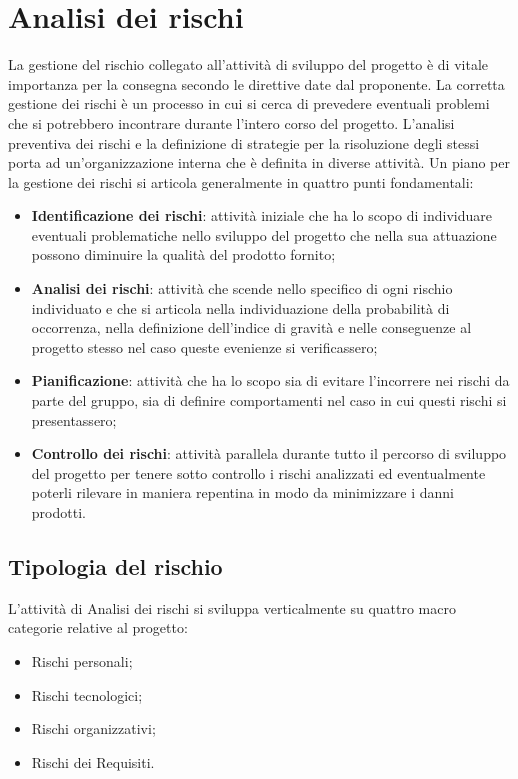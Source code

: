 \section{Analisi dei rischi} \label{_analisiDeiRischi}
	La gestione del rischio collegato all'attività di sviluppo del progetto è di vitale importanza per la consegna secondo le direttive date dal proponente. La corretta gestione dei rischi è un processo in cui si cerca di prevedere eventuali problemi che si potrebbero incontrare durante l'intero corso del progetto. L'analisi preventiva dei rischi e la definizione di strategie per la risoluzione degli stessi porta ad un'organizzazione interna che è definita in diverse attività.
	Un piano per la gestione dei rischi si articola generalmente in quattro punti fondamentali: 
\begin{itemize}
	\item \textbf{Identificazione dei rischi}: attività iniziale che ha lo scopo di individuare eventuali problematiche nello sviluppo del progetto che nella sua attuazione possono diminuire la qualità del prodotto fornito;
	\item \textbf{Analisi dei rischi}: attività che scende nello specifico di ogni rischio individuato e che si articola nella individuazione della probabilità di occorrenza, nella definizione dell'indice di gravità e nelle conseguenze al progetto stesso nel caso queste evenienze si verificassero;
	\item \textbf{Pianificazione}: attività che ha lo scopo sia di evitare l'incorrere nei rischi da parte del gruppo, sia di definire comportamenti nel caso in cui questi rischi si presentassero;
	\item \textbf{Controllo dei rischi}: attività parallela durante tutto il percorso di sviluppo del progetto per tenere sotto controllo i rischi analizzati ed eventualmente poterli rilevare in maniera repentina in modo da minimizzare i danni prodotti.
\end{itemize}

\subsection{Tipologia del rischio}
L'attività di Analisi dei rischi si sviluppa verticalmente su quattro macro categorie relative al progetto:
\begin{itemize}
	\item Rischi personali;
	\item Rischi tecnologici;
	\item Rischi organizzativi;
	\item Rischi dei Requisiti.
\end{itemize}

